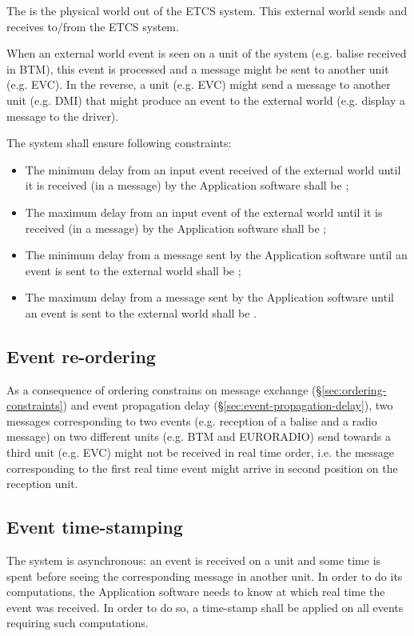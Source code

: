 The  is the physical world out of the ETCS
system. This external world sends and receives  to/from
the ETCS system.

When an external world event is seen on a unit of the system
(e.g. balise received in BTM), this event is processed and a message
might be sent to another unit (e.g. EVC). In the reverse, a unit
(e.g. EVC) might send a message to another unit (e.g. DMI) that might
produce an event to the external world (e.g. display a message to the
driver).

The system shall ensure following constraints:
\begin{itemize}
\item The minimum delay from an input event received of the external
  world until it is received (in a message) by the Application
  software shall be ;
\item The maximum delay from an input event of the external world
  until it is received (in a message) by the Application software
  shall be ;
\item The minimum delay from a message sent by the Application
  software until an event is sent to the external world shall be
  ;
\item The maximum delay from a message sent by the Application
  software until an event is sent to the external world shall be
  .
\end{itemize}

\subsection{Event re-ordering}

As a consequence of ordering constrains on message exchange
(§\ref{sec:ordering-constraints}) and event propagation delay
(§\ref{sec:event-propagation-delay}), two messages corresponding to
two events (e.g. reception of a balise and a radio message) on two
different units (e.g. BTM and EURORADIO) send towards a third unit
(e.g. EVC) might not be received in real time order, i.e. the message
corresponding to the first real time event might arrive in second
position on the reception unit.

\subsection{Event time-stamping}

The system is asynchronous: an event is received on a unit and some
time is spent before seeing the corresponding message in another
unit. In order to do its computations, the Application software needs
to know at which real time the event was received. In order to do so,
a time-stamp shall be applied on all events requiring such
computations. 

